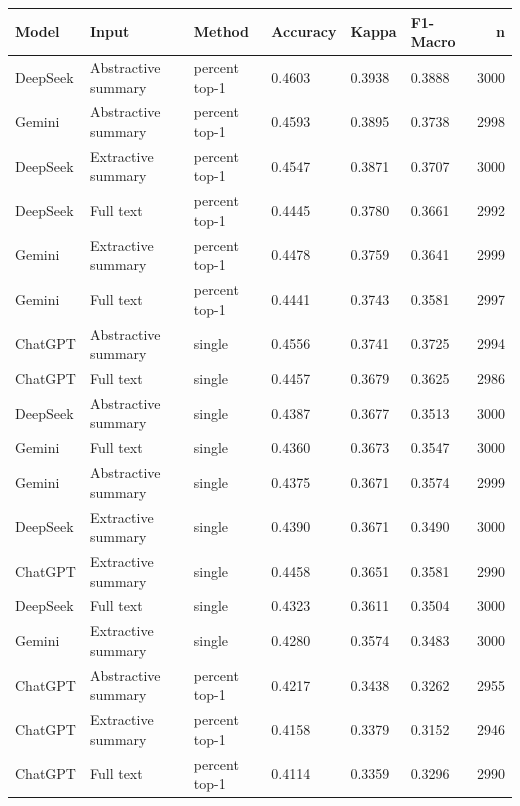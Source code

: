 \begin{tabular}{llllllr}
\toprule
Model & Input & Method & Accuracy & Kappa & F1-Macro & n \\
\midrule
DeepSeek & Abstractive summary & percent top-1 & 0.4603 & 0.3938 & 0.3888 & 3000 \\
Gemini & Abstractive summary & percent top-1 & 0.4593 & 0.3895 & 0.3738 & 2998 \\
DeepSeek & Extractive summary & percent top-1 & 0.4547 & 0.3871 & 0.3707 & 3000 \\
DeepSeek & Full text & percent top-1 & 0.4445 & 0.3780 & 0.3661 & 2992 \\
Gemini & Extractive summary & percent top-1 & 0.4478 & 0.3759 & 0.3641 & 2999 \\
Gemini & Full text & percent top-1 & 0.4441 & 0.3743 & 0.3581 & 2997 \\
ChatGPT & Abstractive summary & single & 0.4556 & 0.3741 & 0.3725 & 2994 \\
ChatGPT & Full text & single & 0.4457 & 0.3679 & 0.3625 & 2986 \\
DeepSeek & Abstractive summary & single & 0.4387 & 0.3677 & 0.3513 & 3000 \\
Gemini & Full text & single & 0.4360 & 0.3673 & 0.3547 & 3000 \\
Gemini & Abstractive summary & single & 0.4375 & 0.3671 & 0.3574 & 2999 \\
DeepSeek & Extractive summary & single & 0.4390 & 0.3671 & 0.3490 & 3000 \\
ChatGPT & Extractive summary & single & 0.4458 & 0.3651 & 0.3581 & 2990 \\
DeepSeek & Full text & single & 0.4323 & 0.3611 & 0.3504 & 3000 \\
Gemini & Extractive summary & single & 0.4280 & 0.3574 & 0.3483 & 3000 \\
ChatGPT & Abstractive summary & percent top-1 & 0.4217 & 0.3438 & 0.3262 & 2955 \\
ChatGPT & Extractive summary & percent top-1 & 0.4158 & 0.3379 & 0.3152 & 2946 \\
ChatGPT & Full text & percent top-1 & 0.4114 & 0.3359 & 0.3296 & 2990 \\
\bottomrule
\end{tabular}
